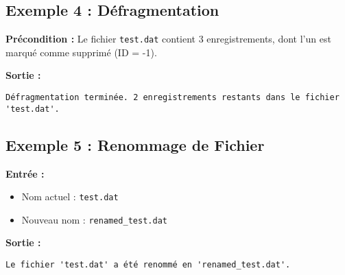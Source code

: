 \documentclass{article}
\begin{document}
\subsection*{Exemple 4 : Défragmentation}
\textbf{Précondition :} Le fichier \texttt{test.dat} contient 3 enregistrements, dont l'un est marqué comme supprimé (ID = -1).

\textbf{Sortie :}
\begin{verbatim}
Défragmentation terminée. 2 enregistrements restants dans le fichier 'test.dat'.
\end{verbatim}

\subsection*{Exemple 5 : Renommage de Fichier}
\textbf{Entrée :}
\begin{itemize}
    \item Nom actuel : \texttt{test.dat}
    \item Nouveau nom : \texttt{renamed_test.dat}
\end{itemize}
\textbf{Sortie :}
\begin{verbatim}
Le fichier 'test.dat' a été renommé en 'renamed_test.dat'.
\end{verbatim}
\end{document}
